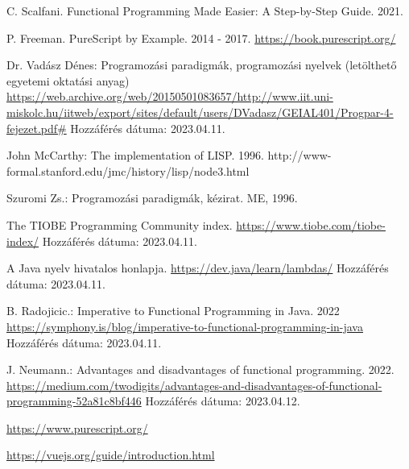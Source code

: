\documentclass[12pt]{article}
\newtheorem{definíció}[theorem]{Definíció}
\begin{document}


\newpage
\renewcommand{\refname}{Irodalomjegyzék}
\begin{thebibliography}{99}

C. Scalfani. Functional Programming Made Easier: A Step-by-Step Guide. 2021.

P. Freeman. PureScript by Example. 2014 - 2017.
\url{https://book.purescript.org/}

Dr. Vadász Dénes: Programozási paradigmák, programozási nyelvek (letölthető egyetemi oktatási anyag)
\url{https://web.archive.org/web/20150501083657/http://www.iit.uni-miskolc.hu/iitweb/export/sites/default/users/DVadasz/GEIAL401/Progpar-4-fejezet.pdf#}
Hozzáférés dátuma: 2023.04.11.

John McCarthy: The implementation of LISP. 1996.
http://www-formal.stanford.edu/jmc/history/lisp/node3.html

Szuromi Zs.: Programozási paradigmák, kézirat. ME, 1996.

The TIOBE Programming Community index. \url{https://www.tiobe.com/tiobe-index/} Hozzáférés dátuma: 2023.04.11.

A Java nyelv hivatalos honlapja. \url{https://dev.java/learn/lambdas/}  Hozzáférés dátuma: 2023.04.11.

B. Radojicic.: Imperative to Functional Programming in Java. 2022
\url{https://symphony.is/blog/imperative-to-functional-programming-in-java} Hozzáférés dátuma: 2023.04.11.

J. Neumann.: Advantages and disadvantages of functional programming. 2022.
\url{https://medium.com/twodigits/advantages-and-disadvantages-of-functional-programming-52a81c8bf446}
Hozzáférés dátuma: 2023.04.12.

\url{https://www.purescript.org/}

\url{https://vuejs.org/guide/introduction.html}

\end{thebibliography}
\end{document}
